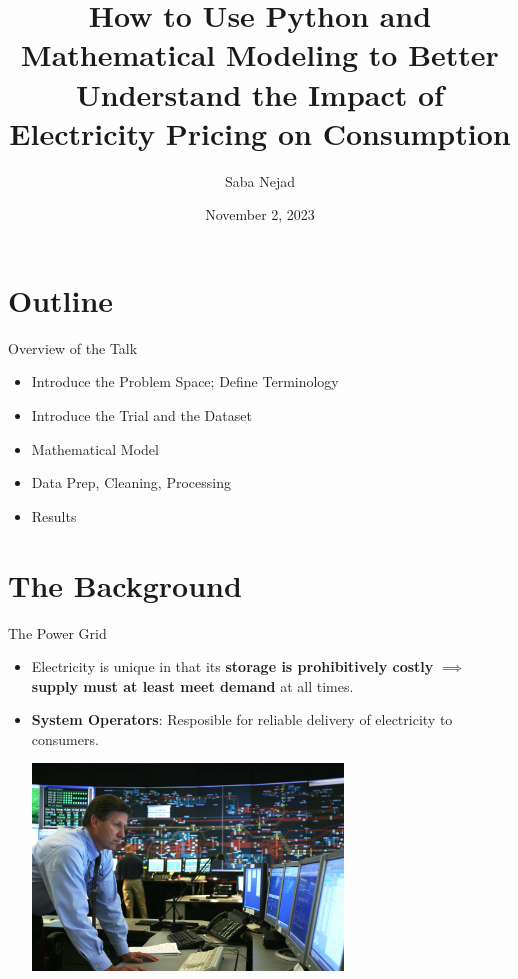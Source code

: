 \documentclass{beamer}
\title{How to Use Python and Mathematical Modeling to Better Understand the Impact of Electricity Pricing on Consumption}
\date{November 2, 2023}
\author{Saba Nejad}
\institute{PyData NYC 2023}
\begin{document}
\maketitle

\section{Outline}

\begin{frame}{Overview of the Talk}
  \begin{itemize}
  \item Introduce the Problem Space; Define Terminology
  \item Introduce the Trial and the Dataset
  \item Mathematical Model
  \item Data Prep, Cleaning, Processing
  \item Results
  \end{itemize}
\end{frame}

\section{The Background}

\begin{frame}{The Power Grid}
  \begin{itemize}
    \item<+-> Electricity is unique in that its \textbf{storage is prohibitively costly} $\implies$ \textbf{supply must at least meet demand} at all times. 
    \item<+-> \textbf{System Operators}: Resposible for reliable delivery of electricity to consumers.
    \vspace{0.2cm}
    \begin{center}
      \includegraphics[width=0.65\textwidth]{images/iso-control-room.png}
    \end{center}
  \end{itemize}
\end{frame}
\end{document}
